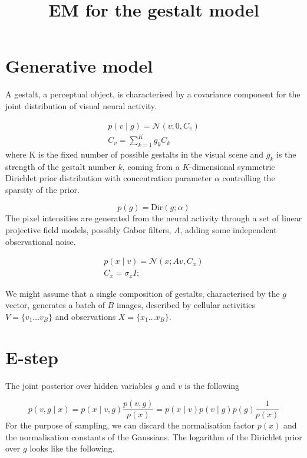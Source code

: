 \documentclass{paper}
\begin{document}
\title{EM for the gestalt model}
\maketitle

\section{Generative model}

A gestalt, a perceptual object, is characterised by a covariance component for the joint distribution of visual neural activity. 

\begin{eqnarray}
p(v \mid g) = \mathcal{N}(v; 0,C_v) \\
C_v = \sum_{k=1}^K g_k C_k \label{eq:cv}
\end{eqnarray}
%
where K is the fixed number of possible gestalts in the visual scene and $g_k$ is the strength of the gestalt number $k$, coming from a $K$-dimensional symmetric Dirichlet prior distribution with concentration parameter $\alpha$ controlling the sparsity of the prior.

\begin{equation}
p(g) = \textrm{Dir}(g; \alpha)
\end{equation}
%
The pixel intensities are generated from the neural activity through a set of linear projective field models, possibly Gabor filters, $A$, adding some independent observational noise.

\begin{eqnarray}
p(x \mid v) = \mathcal{N}(x; Av,C_x) \\
C_x = \sigma_x I;
\end{eqnarray}

We might assume that a single composition of gestalts, characterised by the $g$ vector, generates a batch of $B$ images, described by cellular activities $V = \lbrace v_1 \dots v_B \rbrace$ and observations $X = \lbrace x_1 \dots x_B \rbrace$. 

\section{E-step}

The joint posterior over hidden variables $g$ and $v$ is the following

\begin{equation}
p(v,g \mid x) = p(x \mid v,g) \frac{p(v,g)}{p(x)} = p(x \mid v) p(v \mid g) p(g)\frac{1}{p(x)}
\end{equation}
%
For the purpose of sampling, we can discard the normalisation factor $p(x)$ and the normalisation constants of the Gaussians. The logarithm of the Dirichlet prior over $g$ looks like the following. 
\end{document}
